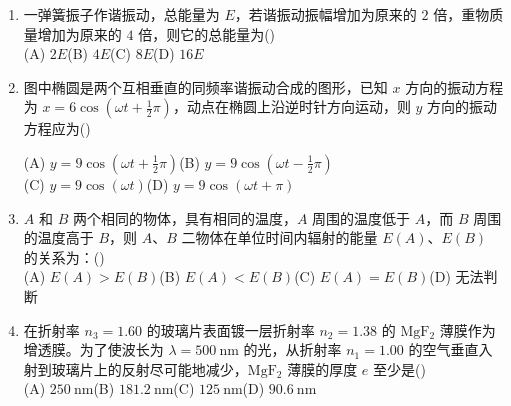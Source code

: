 \documentclass[zihao=5,a4paper,UTF8]{ctexart}
\newcommand{\choicebox}{\hfill(\hspace{1.8em})}
\begin{document}
\begin{enumerate}[leftmargin=2em, itemsep=6pt]
    \item 一弹簧振子作谐振动，总能量为 $E$，若谐振动振幅增加为原来的 $2$ 倍，重物质量增加为原来的 $4$ 倍，则它的总能量为\choicebox\\
    (A) $2E$\qquad (B) $4E$\qquad (C) $8E$\qquad (D) $16E$

    \item 图中椭圆是两个互相垂直的同频率谐振动合成的图形，已知 $x$ 方向的振动方程为 $x = 6\cos\left(\omega t + \frac{1}{2}\pi\right)$，动点在椭圆上沿逆时针方向运动，则 $y$ 方向的振动方程应为\choicebox\\
    \begin{minipage}[t]{0.68\textwidth}
    (A) $y = 9\cos\left(\omega t + \frac{1}{2}\pi\right)$\qquad (B) $y = 9\cos\left(\omega t - \frac{1}{2}\pi\right)$\\[4pt]
    (C) $y = 9\cos(\omega t)$\qquad\qquad (D) $y = 9\cos(\omega t + \pi)$
    \end{minipage}%
    \begin{minipage}[t]{0.30\textwidth}
    \centering
    \end{minipage}

    \item $A$ 和 $B$ 两个相同的物体，具有相同的温度，$A$ 周围的温度低于 $A$，而 $B$ 周围的温度高于 $B$，则 $A$、$B$ 二物体在单位时间内辐射的能量 $E(A)$、$E(B)$ 的关系为：\choicebox\\
    (A) $E(A) > E(B)$\qquad (B) $E(A) < E(B)$\qquad (C) $E(A) = E(B)$\qquad (D) 无法判断

    \item 在折射率 $n_3 = 1.60$ 的玻璃片表面镀一层折射率 $n_2 = 1.38$ 的 $\mathrm{MgF_2}$ 薄膜作为增透膜。为了使波长为 $\lambda = 500\ \mathrm{nm}$ 的光，从折射率 $n_1 = 1.00$ 的空气垂直入射到玻璃片上的反射尽可能地减少，$\mathrm{MgF_2}$ 薄膜的厚度 $e$ 至少是\choicebox\\
    (A) $250\ \mathrm{nm}$\qquad (B) $181.2\ \mathrm{nm}$\qquad (C) $125\ \mathrm{nm}$\qquad (D) $90.6\ \mathrm{nm}$


\end{enumerate}
\end{document}
